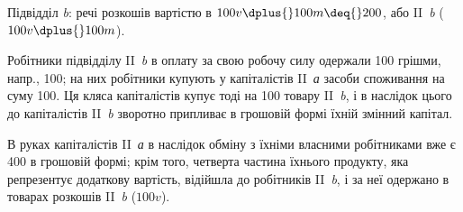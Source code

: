 \noindent{}Підвідділ \emph{b}: речі розкошів вартістю в $100 v \dplus{} 100 m \deq{} 200$, або
II~\emph{b} ($100 v \dplus{} 100 m$).

Робітники підвідділу II~\emph{b} в оплату за свою робочу силу одержали
100 грішми, напр., 100; на них робітники купують у капіталістів
II~\emph{а} засоби споживання на суму 100. Ця кляса капіталістів купує
тоді на 100 товару II~\emph{b}, і в наслідок цього до капіталістів II~\emph{b}
зворотно припливає в грошовій формі їхній змінний капітал.

В руках капіталістів II~\emph{а} в наслідок обміну з їхніми власними робітниками
вже є 400 в грошовій формі; крім того, четверта частина їхнього
продукту, яка репрезентує додаткову вартість, відійшла до робітників
II~\emph{b}, і за неї одержано в товарах розкошів II~\emph{b} ($100 v$).
